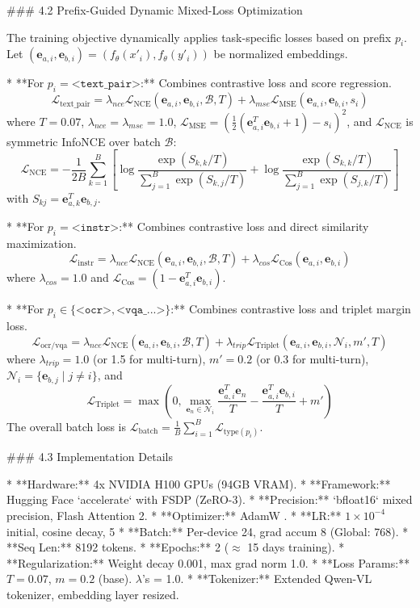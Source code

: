 ### 4.2 Prefix-Guided Dynamic Mixed-Loss Optimization

The training objective dynamically applies task-specific losses based on prefix $p_i$. Let $(\mathbf{e}_{a,i}, \mathbf{e}_{b,i}) = (f_\theta(x'_i), f_\theta(y'_i))$ be normalized embeddings.

*   **For $p_i = \texttt{<text\_pair>}$:** Combines contrastive loss and score regression.
    $$ \mathcal{L}_{\text{text\_pair}} = \lambda_{nce} \mathcal{L}_{\text{NCE}}(\mathbf{e}_{a,i}, \mathbf{e}_{b,i}, \mathcal{B}, T) + \lambda_{mse} \mathcal{L}_{\text{MSE}}(\mathbf{e}_{a,i}, \mathbf{e}_{b,i}, s_i) $$
    where $T=0.07$, $\lambda_{nce}=\lambda_{mse}=1.0$, $\mathcal{L}_{\text{MSE}} = (\frac{1}{2}(\mathbf{e}_{a,i}^T \mathbf{e}_{b,i} + 1) - s_i)^2$, and $\mathcal{L}_{\text{NCE}}$ is symmetric InfoNCE over batch $\mathcal{B}$:
    $$ \mathcal{L}_{\text{NCE}} = -\frac{1}{2B} \sum_{k=1}^{B} \left[ \log \frac{\exp(S_{k,k}/T)}{\sum_{j=1}^{B} \exp(S_{k,j}/T)} + \log \frac{\exp(S_{k,k}/T)}{\sum_{j=1}^{B} \exp(S_{j,k}/T)} \right] $$
    with $S_{kj} = \mathbf{e}_{a,k}^T \mathbf{e}_{b,j}$.

*   **For $p_i = \texttt{<instr>}$:** Combines contrastive loss and direct similarity maximization.
    $$ \mathcal{L}_{\text{instr}} = \lambda_{nce} \mathcal{L}_{\text{NCE}}(\mathbf{e}_{a,i}, \mathbf{e}_{b,i}, \mathcal{B}, T) + \lambda_{cos} \mathcal{L}_{\text{Cos}}(\mathbf{e}_{a,i}, \mathbf{e}_{b,i}) $$
    where $\lambda_{cos}=1.0$ and $\mathcal{L}_{\text{Cos}} = (1 - \mathbf{e}_{a,i}^T \mathbf{e}_{b,i})$.

*   **For $p_i \in \{ \texttt{<ocr>}, \texttt{<vqa\_...>} \}$:** Combines contrastive loss and triplet margin loss.
    $$ \mathcal{L}_{\text{ocr/vqa}} = \lambda_{nce} \mathcal{L}_{\text{NCE}}(\mathbf{e}_{a,i}, \mathbf{e}_{b,i}, \mathcal{B}, T) + \lambda_{trip} \mathcal{L}_{\text{Triplet}}(\mathbf{e}_{a,i}, \mathbf{e}_{b,i}, \mathcal{N}_i, m', T) $$
    where $\lambda_{trip}=1.0$ (or 1.5 for multi-turn), $m'=0.2$ (or 0.3 for multi-turn), $\mathcal{N}_i = \{ \mathbf{e}_{b,j} \mid j \neq i \}$, and
    $$ \mathcal{L}_{\text{Triplet}} = \max\left(0, \max_{\mathbf{e}_{n} \in \mathcal{N}_i} \frac{\mathbf{e}_{a,i}^T \mathbf{e}_{n}}{T} - \frac{\mathbf{e}_{a,i}^T \mathbf{e}_{b,i}}{T} + m'\right) $$
The overall batch loss is $\mathcal{L}_{\text{batch}} = \frac{1}{B} \sum_{i=1}^{B} \mathcal{L}_{\text{type}(p_i)}$.

### 4.3 Implementation Details

*   **Hardware:** 4x NVIDIA H100 GPUs (94GB VRAM).
*   **Framework:** Hugging Face `accelerate` with FSDP (ZeRO-3).
*   **Precision:** `bfloat16` mixed precision, Flash Attention 2.
*   **Optimizer:** AdamW \cite{loshchilov2017decoupled}.
*   **LR:** $1 \times 10^{-4}$ initial, cosine decay, 5%
*   **Batch:** Per-device 24, grad accum 8 (Global: 768).
*   **Seq Len:** 8192 tokens.
*   **Epochs:** 2 ($\approx$ 15 days training).
*   **Regularization:** Weight decay 0.001, max grad norm 1.0.
*   **Loss Params:** $T=0.07$, $m=0.2$ (base). $\lambda$'s = 1.0.
*   **Tokenizer:** Extended Qwen-VL tokenizer, embedding layer resized.

